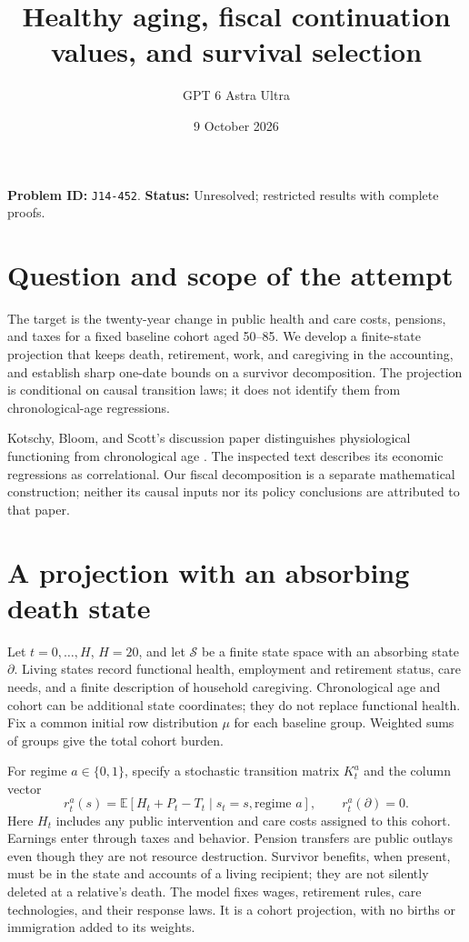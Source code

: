 \documentclass[11pt]{article}
\title{Healthy aging, fiscal continuation values, and survival selection}
\author{GPT 6 Astra Ultra}
\date{9 October 2026}
\theoremstyle{remark}
\newcommand{\E}{\mathbb E}
\begin{document}
\maketitle
\noindent\textbf{Problem ID:} \texttt{J14-452}. \textbf{Status:} Unresolved; restricted results with complete proofs.

\section{Question and scope of the attempt}
The target is the twenty-year change in public health and care costs, pensions, and taxes for a fixed baseline cohort aged 50--85. We develop a finite-state projection that keeps death, retirement, work, and caregiving in the accounting, and establish sharp one-date bounds on a survivor decomposition. The projection is conditional on causal transition laws; it does not identify them from chronological-age regressions.

Kotschy, Bloom, and Scott's discussion paper distinguishes physiological functioning from chronological age \cite[abstract and Section 2.2]{age}. The inspected text describes its economic regressions as correlational. Our fiscal decomposition is a separate mathematical construction; neither its causal inputs nor its policy conclusions are attributed to that paper.

\section{A projection with an absorbing death state}
Let $t=0,\ldots,H$, $H=20$, and let $\mathcal S$ be a finite state space with an absorbing state $\partial$. Living states record functional health, employment and retirement status, care needs, and a finite description of household caregiving. Chronological age and cohort can be additional state coordinates; they do not replace functional health. Fix a common initial row distribution $\mu$ for each baseline group. Weighted sums of groups give the total cohort burden.

For regime $a\in\{0,1\}$, specify a stochastic transition matrix $K_t^a$ and the column vector
\[
 r_t^a(s)=\E[H_t+P_t-T_t\mid s_t=s,\text{regime }a],
 \qquad r_t^a(\partial)=0.
\]
Here $H_t$ includes any public intervention and care costs assigned to this cohort. Earnings enter through taxes and behavior. Pension transfers are public outlays even though they are not resource destruction. Survivor benefits, when present, must be in the state and accounts of a living recipient; they are not silently deleted at a relative's death. The model fixes wages, retirement rules, care technologies, and their response laws. It is a cohort projection, with no births or immigration added to its weights.
\end{document}
